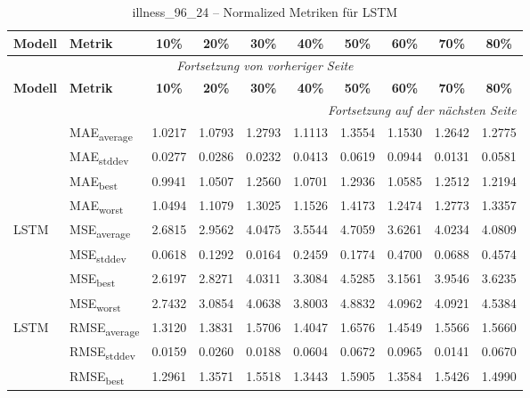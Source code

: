 {\small
\begin{longtable}{l l c c c c c c c c}
    \toprule
    \textbf{Modell} & \textbf{Metrik} & \textbf{10\%} & \textbf{20\%} & \textbf{30\%} & \textbf{40\%} & \textbf{50\%} & \textbf{60\%} & \textbf{70\%} & \textbf{80\%} \\
    \midrule
    \endfirsthead
    \multicolumn{10}{c}{\textit{Fortsetzung von vorheriger Seite}} \\
    \toprule
    \textbf{Modell} & \textbf{Metrik} & \textbf{10\%} & \textbf{20\%} & \textbf{30\%} & \textbf{40\%} & \textbf{50\%} & \textbf{60\%} & \textbf{70\%} & \textbf{80\%} \\
    \midrule
    \endhead
    \midrule
    \multicolumn{10}{r}{\textit{Fortsetzung auf der nächsten Seite}} \\
    \midrule
    \endfoot
    \bottomrule
    \caption{illness_96_24 -- Normalized Metriken für LSTM}
    \label{tab:illness_96_24_normalized_lstm}
    \endlastfoot
\multirow{4}{*}{LSTM} & MAE\textsubscript{average} & 1.0217 & 1.0793 & 1.2793 & 1.1113 & 1.3554 & 1.1530 & 1.2642 & 1.2775 \\
 & MAE\textsubscript{stddev} & 0.0277 & 0.0286 & 0.0232 & 0.0413 & 0.0619 & 0.0944 & 0.0131 & 0.0581 \\
 & MAE\textsubscript{best} & 0.9941 & 1.0507 & 1.2560 & 1.0701 & 1.2936 & 1.0585 & 1.2512 & 1.2194 \\
 & MAE\textsubscript{worst} & 1.0494 & 1.1079 & 1.3025 & 1.1526 & 1.4173 & 1.2474 & 1.2773 & 1.3357 \\
\cmidrule(lr){2-10}
\multirow{4}{*}{LSTM} & MSE\textsubscript{average} & 2.6815 & 2.9562 & 4.0475 & 3.5544 & 4.7059 & 3.6261 & 4.0234 & 4.0809 \\
 & MSE\textsubscript{stddev} & 0.0618 & 0.1292 & 0.0164 & 0.2459 & 0.1774 & 0.4700 & 0.0688 & 0.4574 \\
 & MSE\textsubscript{best} & 2.6197 & 2.8271 & 4.0311 & 3.3084 & 4.5285 & 3.1561 & 3.9546 & 3.6235 \\
 & MSE\textsubscript{worst} & 2.7432 & 3.0854 & 4.0638 & 3.8003 & 4.8832 & 4.0962 & 4.0921 & 4.5384 \\
\cmidrule(lr){2-10}
\multirow{4}{*}{LSTM} & RMSE\textsubscript{average} & 1.3120 & 1.3831 & 1.5706 & 1.4047 & 1.6576 & 1.4549 & 1.5566 & 1.5660 \\
 & RMSE\textsubscript{stddev} & 0.0159 & 0.0260 & 0.0188 & 0.0604 & 0.0672 & 0.0965 & 0.0141 & 0.0670 \\
 & RMSE\textsubscript{best} & 1.2961 & 1.3571 & 1.5518 & 1.3443 & 1.5905 & 1.3584 & 1.5426 & 1.4990 \\

\end{longtable}}
